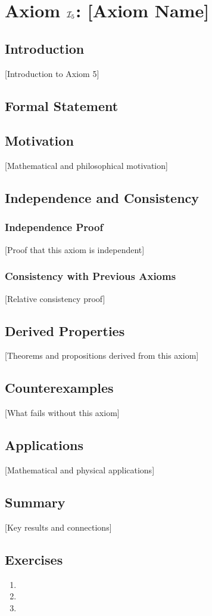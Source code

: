 \chapter{Axiom $\mathcal{I}_5$: [Axiom Name]}
\label{ch:axiom-I5}

\section{Introduction}
[Introduction to Axiom 5]

\section{Formal Statement}
\begin{axiom}
\end{axiom}

\section{Motivation}
[Mathematical and philosophical motivation]

\section{Independence and Consistency}
\subsection{Independence Proof}
[Proof that this axiom is independent]

\subsection{Consistency with Previous Axioms}
[Relative consistency proof]

\section{Derived Properties}
[Theorems and propositions derived from this axiom]

\section{Counterexamples}
[What fails without this axiom]

\section{Applications}
[Mathematical and physical applications]

\section{Summary}
[Key results and connections]

\section{Exercises}
\begin{enumerate}
\item [Exercise 1]
\item [Exercise 2]
\item [Exercise 3]
\end{enumerate}
